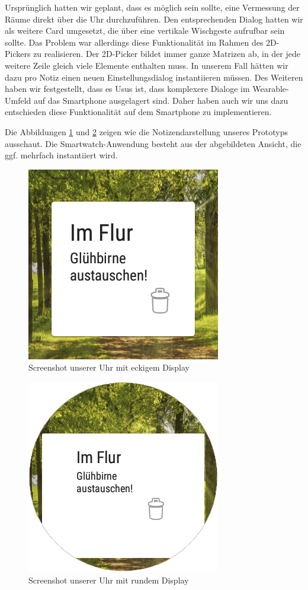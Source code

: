 Ursprünglich hatten wir geplant, dass es möglich sein sollte, eine Vermessung der Räume direkt über die Uhr durchzuführen. Den entsprechenden Dialog hatten wir als weitere Card umgesetzt, die über eine vertikale Wischgeste aufrufbar sein sollte. Das Problem war allerdings diese Funktionalität im Rahmen des 2D-Pickers zu realisieren. Der 2D-Picker bildet immer ganze Matrizen ab, in der jede weitere Zeile gleich viele Elemente enthalten muss. In unserem Fall hätten wir dazu pro Notiz einen neuen Einstellungsdialog instantiieren müssen.  Des Weiteren haben wir festgestellt, dass es Usus ist, dass komplexere Dialoge im Wearable-Umfeld auf das Smartphone ausgelagert sind. Daher haben auch wir uns dazu entschieden diese Funktionalität auf dem Smartphone zu implementieren.

Die Abbildungen \ref{fig:ScreenshotWatchEckig} und \ref{fig:ScreenshotWatchRund} zeigen wie die Notizendarstellung unseres Prototyps ausschaut. Die Smartwatch-Anwendung besteht aus der abgebildeten Ansicht, die ggf. mehrfach instantiiert wird.

\begin{figure}[H]
\centering
\includegraphics[width=0.3\linewidth]{../Bilder/ScreenshotWatchEckig}
\caption{Screenshot unserer Uhr mit eckigem Display}
\label{fig:ScreenshotWatchEckig}
\end{figure}

\begin{figure}[H]
\centering
\includegraphics[width=0.3\linewidth]{../Bilder/ScreenshotWatchRund}
\caption{Screenshot unserer Uhr mit rundem Display}
\label{fig:ScreenshotWatchRund}
\end{figure}

